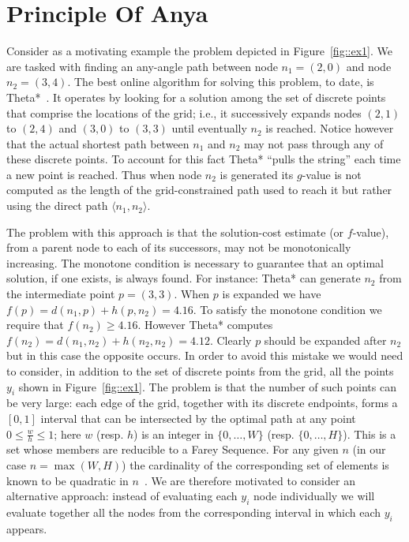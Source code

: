 \section{Principle Of Anya}
Consider as a motivating example the problem depicted in Figure~\ref{fig::ex1}.
We are tasked with finding an any-angle path between node $n_1 = (2, 0)$ and
node $n_2 = (3, 4)$.  The best online algorithm for solving this problem, to
date, is Theta*~\cite{nash07}. It operates by looking for a solution among the
set of discrete points that comprise the locations of the grid; i.e.,
it successively expands nodes $(2,1)$ to $(2,4)$ and $(3,0)$ to $(3,3)$ until
eventually $n_2$ is reached.  Notice however that the actual shortest path
between $n_1$ and $n_2$ may not pass through any of these discrete points.  To
account for this fact Theta* ``pulls the string'' each time a new
point is reached.  Thus when node $n_2$ is generated its $g$-value is not
computed as the length of the grid-constrained path used to reach it but rather
using the direct path $\langle n_1, n_2 \rangle$.

%    

The problem with this approach is that the solution-cost estimate
(or $f$-value), from a parent node to each of its successors, may 
not be monotonically increasing.  The monotone condition is
necessary to guarantee that an optimal solution, if one exists, is always found.
For instance: Theta* can generate $n_2$ from the intermediate point $p = (3,3)$.
When $p$ is expanded we have $f(p) = d(n_1, p) + h(p, n_2) = 4.16$. 
To satisfy the monotone condition we require that $f(n_2) \geq 4.16$. However 
Theta* computes $f(n_2) = d(n_1, n_2) + h(n_2, n_2) = 4.12$.
Clearly $p$ should be expanded after $n_2$ but in this case the opposite occurs.  
In order to avoid this mistake we would need to consider, in addition to the
set of discrete points from the grid, all the points $y_i$ shown in Figure~\ref{fig::ex1}.
The problem is that the number of such points can be very large:
each edge of the grid, together with its discrete endpoints, 
forms a $[0, 1]$ interval that can be intersected by the optimal
path at any point $0 \leq \frac{w}{h} \leq 1$; here $w$ (resp. $h$) is an integer in
$\{0,\dots,W\}$ (resp.  $\{0,\dots,H\}$).
This is a set whose members are reducible to a Farey Sequence.
For any given $n$ (in our case $n = \max(W, H)$) the cardinality of the corresponding 
set of elements is known to be quadratic in $n$~\cite{concrete89}.
We are therefore motivated to consider an alternative approach: instead
of evaluating each $y_i$ node individually we will evaluate together
all the nodes from the corresponding interval in which each $y_i$ appears.


